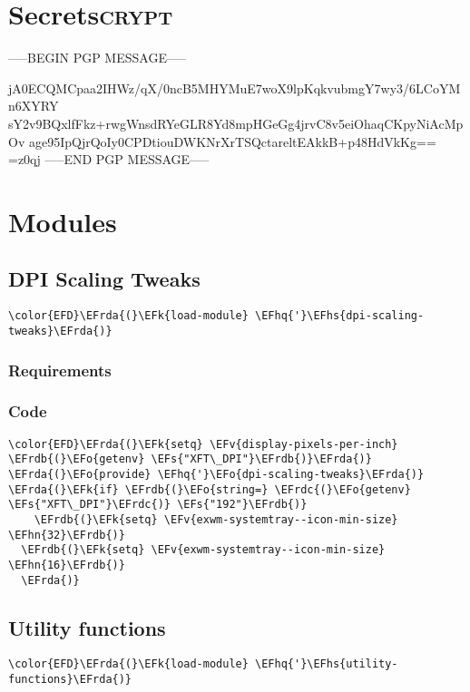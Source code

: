 \documentclass[a4wide,10pt]{article}
\newcommand{\EFs}[1]{\textcolor{EFs}{#1}} %
\newcommand{\EFk}[1]{\textcolor{EFk}{#1}} %
\newcommand{\EFv}[1]{\textcolor{EFv}{#1}} %
\newcommand{\EFo}[1]{\textcolor{EFo}{#1}} %
\newcommand{\EFhn}[1]{\textcolor{EFhn}{\textbf{#1}}} %
\newcommand{\EFhq}[1]{\textcolor{EFhq}{#1}} %
\newcommand{\EFhs}[1]{\textcolor{EFhs}{#1}} %
\newcommand{\EFrda}[1]{\textcolor{EFrda}{#1}} %
\newcommand{\EFrdb}[1]{\textcolor{EFrdb}{#1}} %
\newcommand{\EFrdc}[1]{\textcolor{EFrdc}{#1}} %
\begin{document}
\section{Secrets\hfill{}\textsc{crypt}}
\label{sec:orgf710807}
-----BEGIN PGP MESSAGE-----

jA0ECQMCpaa2IHWz/qX/0ncB5MHYMuE7woX9lpKqkvubmgY7wy3/6LCoYMn6XYRY
sY2v9BQxlfFkz+rwgWnsdRYeGLR8Yd8mpHGeGg4jrvC8v5eiOhaqCKpyNiAcMpOv
age95IpQjrQoIy0CPDtiouDWKNrXrTSQctareltEAkkB+p48HdVkKg==
=z0qj
-----END PGP MESSAGE-----
\section{Modules}
\label{sec:org62a56e9}
\subsection{DPI Scaling Tweaks}
\label{sec:org5c40d7c}
\begin{Code}
\begin{Verbatim}
\color{EFD}\EFrda{(}\EFk{load-module} \EFhq{'}\EFhs{dpi-scaling-tweaks}\EFrda{)}
\end{Verbatim}
\end{Code}
\subsubsection{Requirements}
\label{sec:orga0bfaa9}
\subsubsection{Code}
\label{sec:orgd9b7871}
\begin{Code}
\begin{Verbatim}
\color{EFD}\EFrda{(}\EFk{setq} \EFv{display-pixels-per-inch} \EFrdb{(}\EFo{getenv} \EFs{"XFT\_DPI"}\EFrdb{)}\EFrda{)}
\EFrda{(}\EFo{provide} \EFhq{'}\EFo{dpi-scaling-tweaks}\EFrda{)}
\EFrda{(}\EFk{if} \EFrdb{(}\EFo{string=} \EFrdc{(}\EFo{getenv} \EFs{"XFT\_DPI"}\EFrdc{)} \EFs{"192"}\EFrdb{)}
    \EFrdb{(}\EFk{setq} \EFv{exwm-systemtray--icon-min-size} \EFhn{32}\EFrdb{)}
  \EFrdb{(}\EFk{setq} \EFv{exwm-systemtray--icon-min-size} \EFhn{16}\EFrdb{)}
  \EFrda{)}
\end{Verbatim}
\end{Code}
\subsection{Utility functions}
\label{sec:orgd561a12}
\begin{Code}
\begin{Verbatim}
\color{EFD}\EFrda{(}\EFk{load-module} \EFhq{'}\EFhs{utility-functions}\EFrda{)}
\end{Verbatim}
\end{Code}
\end{document}
